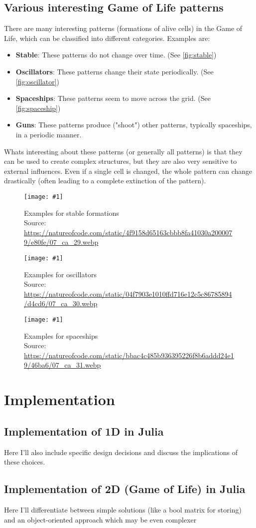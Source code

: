 \documentclass[a4paper,12pt]{llncs}
\numberwithin{equation}{section}
\newcommand{\imagewithwidth}[5]{
  \begin{figure}[htbp]%
    \begin{center}%
      \texttt{[image: \#1]}%
      \caption[#5]{#4}%
      \label{#3}%
    \end{center}%
  \end{figure}
}
\begin{document}
\subsection{Various interesting Game of Life patterns}
There are many interesting patterns (formations of alive cells) in the Game of Life, which can be classified into different categories. Examples are:
\begin{itemize}
  \item \textbf{Stable}: These patterns do not change over time. (See \autoref{fig:stable})
  \item \textbf{Oscillators}: These patterns change their state periodically. (See \autoref{fig:oscillator})
  \item \textbf{Spaceships}: These patterns seem to move across the grid. (See \autoref{fig:spaceship})
  \item \textbf{Guns}: These patterns produce ("shoot") other patterns, typically spaceships, in a periodic manner.
\end{itemize}
Whats interesting about these patterns (or generally all patterns) is that they can be used to create complex structures,
but they are also very sensitive to external influences. Even if a single cell is changed, the whole pattern can change drastically (often leading to a complete extinction of the pattern).
\imagewithwidth{figures/stable}{0.7\textwidth}{fig:stable}{Examples for stable formations\\Source: \url{https://natureofcode.com/static/4f9158d65163cbbb8fa41030a2000079/e80fe/07_ca_29.webp}}{}
\imagewithwidth{figures/oscillator}{0.7\textwidth}{fig:oscillator}{Examples for oscillators\\Source: \url{https://natureofcode.com/static/04f7903e1010ffd716e12c5c86785894/d4cd6/07_ca_30.webp}}{}
\imagewithwidth{figures/spaceship}{0.7\textwidth}{fig:spaceship}{Examples for spaceships\\Source: \url{https://natureofcode.com/static/bbac4c485b936395226f8b6addd24e19/46ba6/07_ca_31.webp}}{}

\section{Implementation}
\subsection{Implementation of 1D in Julia}
Here I'll also include specific design decisions and discuss the implications of these choices.
\subsection{Implementation of 2D (Game of Life) in Julia}
Here I'll differentiate between simple solutions (like a bool matrix for storing)
and an object-oriented approach which may be even complexer
\end{document}
